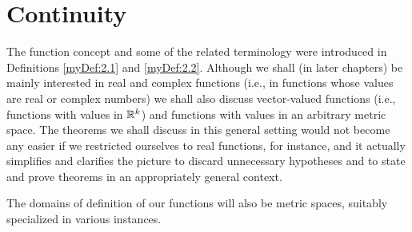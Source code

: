 
\chapter{Continuity}

The function concept and some of the related terminology were introduced in
Definitions \ref{myDef:2.1} and \ref{myDef:2.2}. Although we shall (in later chapters) be mainly interested in real and complex functions (i.e., in functions whose values are real or complex numbers) we shall also discuss vector-valued functions (i.e., functions with values in ${\protect\mathbb R}^{k}$) and functions with values in an arbitrary metric space. The theorems we shall discuss in this general setting would not become any easier if we restricted ourselves to real functions, for instance, and it actually simplifies and clarifies the picture to discard unnecessary hypotheses and to state and prove theorems in an appropriately general context. 

The domains of definition of our functions will also be metric spaces, suitably specialized in various instances.








